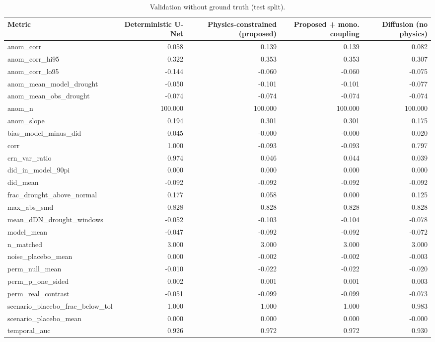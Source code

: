 \begin{table}[t]
\centering
\caption{Validation without ground truth (test split).}
\label{tab:validation}
\scriptsize
\begin{tabular}{lrrrr}
\hline
Metric & Deterministic U-Net & Physics-constrained (proposed) & Proposed + mono. coupling & Diffusion (no physics) \\
\hline
anom\_corr & 0.058 & 0.139 & 0.139 & 0.082 \\
anom\_corr\_hi95 & 0.322 & 0.353 & 0.353 & 0.307 \\
anom\_corr\_lo95 & -0.144 & -0.060 & -0.060 & -0.075 \\
anom\_mean\_model\_drought & -0.050 & -0.101 & -0.101 & -0.077 \\
anom\_mean\_obs\_drought & -0.074 & -0.074 & -0.074 & -0.074 \\
anom\_n & 100.000 & 100.000 & 100.000 & 100.000 \\
anom\_slope & 0.194 & 0.301 & 0.301 & 0.175 \\
bias\_model\_minus\_did & 0.045 & -0.000 & -0.000 & 0.020 \\
corr & 1.000 & -0.093 & -0.093 & 0.797 \\
crn\_var\_ratio & 0.974 & 0.046 & 0.044 & 0.039 \\
did\_in\_model\_90pi & 0.000 & 0.000 & 0.000 & 0.000 \\
did\_mean & -0.092 & -0.092 & -0.092 & -0.092 \\
frac\_drought\_above\_normal & 0.177 & 0.058 & 0.000 & 0.125 \\
max\_abs\_smd & 0.828 & 0.828 & 0.828 & 0.828 \\
mean\_dDN\_drought\_windows & -0.052 & -0.103 & -0.104 & -0.078 \\
model\_mean & -0.047 & -0.092 & -0.092 & -0.072 \\
n\_matched & 3.000 & 3.000 & 3.000 & 3.000 \\
noise\_placebo\_mean & 0.000 & -0.002 & -0.002 & -0.003 \\
perm\_null\_mean & -0.010 & -0.022 & -0.022 & -0.020 \\
perm\_p\_one\_sided & 0.002 & 0.001 & 0.001 & 0.003 \\
perm\_real\_contrast & -0.051 & -0.099 & -0.099 & -0.073 \\
scenario\_placebo\_frac\_below\_tol & 1.000 & 1.000 & 1.000 & 0.983 \\
scenario\_placebo\_mean & 0.000 & 0.000 & 0.000 & -0.000 \\
temporal\_auc & 0.926 & 0.972 & 0.972 & 0.930 \\
\hline
\end{tabular}
\end{table}
